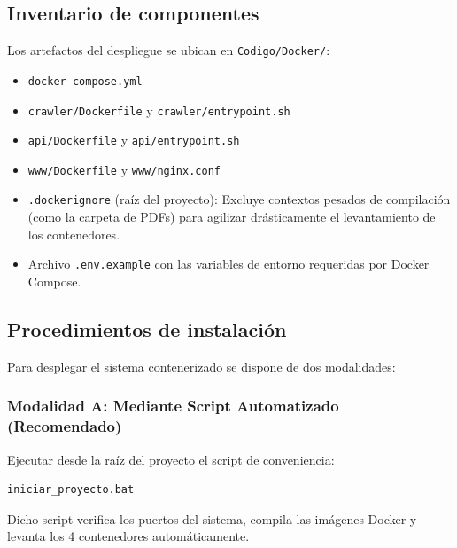 \subsection{Inventario de componentes}
Los artefactos del despliegue se ubican en \texttt{Codigo/Docker/}:
\begin{itemize}
    \item \texttt{docker-compose.yml}
    \item \texttt{crawler/Dockerfile} y \texttt{crawler/entrypoint.sh}
    \item \texttt{api/Dockerfile} y \texttt{api/entrypoint.sh}
    \item \texttt{www/Dockerfile} y \texttt{www/nginx.conf}
    \item \texttt{.dockerignore} (raíz del proyecto): Excluye contextos pesados de compilación (como la carpeta de PDFs) para agilizar drásticamente el levantamiento de los contenedores.
    \item Archivo \texttt{.env.example} con las variables de entorno requeridas por Docker Compose.
\end{itemize}

\subsection{Procedimientos de instalación}
Para desplegar el sistema contenerizado se dispone de dos modalidades:

\subsubsection{Modalidad A: Mediante Script Automatizado (Recomendado)}
Ejecutar desde la raíz del proyecto el script de conveniencia:
\begin{lstlisting}[language=bash]
iniciar_proyecto.bat
\end{lstlisting}
Dicho script verifica los puertos del sistema, compila las imágenes Docker y levanta los 4 contenedores automáticamente.

